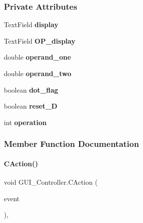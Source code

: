 \subsubsection*{Private Attributes}
\begin{DoxyCompactItemize}
\item 
\mbox{\label{classGUI__Controller_aa756d9f66302e6328e78d72edd55ac18}} 
Text\+Field {\bfseries display}
\item 
\mbox{\label{classGUI__Controller_aa021522bb2112a326ae8461a677130c4}} 
Text\+Field {\bfseries O\+P\+\_\+display}
\item 
\mbox{\label{classGUI__Controller_a2bcbaa0c0c3b82ee2a45869bfe14562b}} 
double {\bfseries operand\+\_\+one}
\item 
\mbox{\label{classGUI__Controller_a0aefa5e433461b7d0e2649a58f2ca2d9}} 
double {\bfseries operand\+\_\+two}
\item 
\mbox{\label{classGUI__Controller_af0ace5297c907a30a11cef1dea65a908}} 
boolean {\bfseries dot\+\_\+flag}
\item 
\mbox{\label{classGUI__Controller_ae270f6e868d0fd41b1bd3aae0ad8971f}} 
boolean {\bfseries reset\+\_\+D}
\item 
\mbox{\label{classGUI__Controller_a981626a034c144c31db9ed51a1e203a3}} 
int {\bfseries operation}
\end{DoxyCompactItemize}


\subsubsection{Member Function Documentation}
\mbox{\label{classGUI__Controller_a33eaf846c2f54a13fcdf8a4e0dfb98d0}} 
\paragraph{\texorpdfstring{C\+Action()}{CAction()}}
{\footnotesize\ttfamily void G\+U\+I\+\_\+\+Controller.\+C\+Action (\begin{DoxyParamCaption}\item[{Action\+Event}]{event }\end{DoxyParamCaption})\hspace{0.3cm}{\ttfamily [inline]}, {\ttfamily [private]}}



